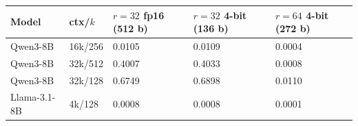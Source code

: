 \begin{tabular}{lllll}
\toprule
Model & ctx/$k$ & $r{=}32$ fp16 (512 b) & $r{=}32$ 4-bit (136 b) & $r{=}64$ 4-bit (272 b) \\
\midrule
Qwen3-8B & 16k/256 & 0.0105 & 0.0109 & 0.0004 \\
Qwen3-8B & 32k/512 & 0.4007 & 0.4033 & 0.0008 \\
Qwen3-8B & 32k/128 & 0.6749 & 0.6898 & 0.0110 \\
Llama-3.1-8B & 4k/128 & 0.0008 & 0.0008 & 0.0001 \\
\bottomrule
\end{tabular}